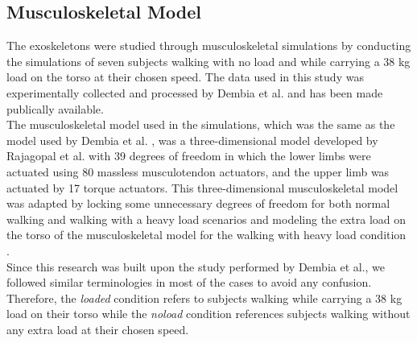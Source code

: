 \documentclass[10pt,letterpaper]{article}
\begin{document}
\subsection*{Musculoskeletal Model}
The exoskeletons were studied through musculoskeletal simulations by conducting the simulations of seven subjects walking with no load and while carrying a 38 kg load on the torso at their chosen speed. The data used in this study was experimentally collected and processed by Dembia et al. \cite{93} and has been made publically available.\\ 
The musculoskeletal model used in the simulations, which was the same as the model used by Dembia et al. \cite{93}, was a three-dimensional model developed by Rajagopal et al. \cite{130} with 39 degrees of freedom in which the lower limbs were actuated using 80 massless musculotendon actuators, and the upper limb was actuated by 17 torque actuators\cite{130}. This three-dimensional musculoskeletal model was adapted by locking some unnecessary degrees of freedom for both normal walking and walking with a heavy load scenarios and modeling the extra load on the torso of the musculoskeletal model for the walking with heavy load condition \cite{93}.\\
Since this research was built upon the study performed by Dembia et al., we followed similar terminologies in most of the cases to avoid any confusion. Therefore, the \textit{loaded} condition refers to subjects walking while carrying a 38 kg load on their torso while the \textit{noload} condition references subjects walking without any extra load at their chosen speed.
\end{document}
